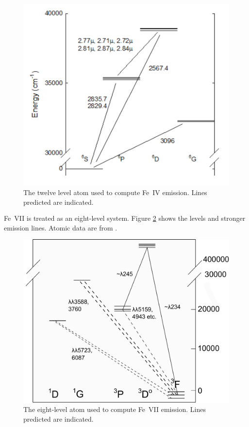\begin{figure}
\centering
\label{fig:FeIV_model}
\includegraphics[scale=0.8]{FeIV_model}
\caption[Fe~IV model atom]{The twelve level atom used to compute Fe~IV emission.  Lines
predicted are indicated.}
\end{figure}

Fe~VII is treated as an eight-level system.
Figure \ref{fig:Fe7_levels} shows the levels
and stronger emission lines.
Atomic data are from \citet{Berrington2000}.

\begin{figure}
\centering
\label{fig:Fe7_levels}
\includegraphics[scale=0.9]{Fe7_levels}
\caption[Fe~VII model atom]{The eight-level atom used to compute Fe~VII emission.  Lines
predicted are indicated.}
\end{figure}

